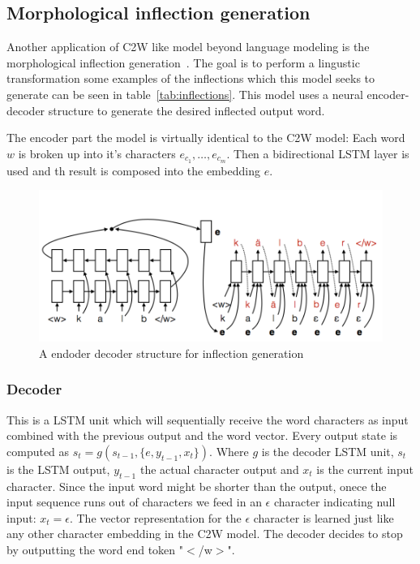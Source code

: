 \subsection{Morphological inflection generation} 

Another application of C2W like model beyond language modeling is the morphological inflection generation~\cite{DBLP:journals/corr/FaruquiTND15}.
The goal is to perform a lingustic transformation some examples of the inflections which this model seeks to 
generate can be seen in table~\ref{tab:inflections}.
This model uses a neural encoder-decoder structure to generate the desired inflected output word.

The encoder part the model is virtually identical to the C2W model: 
Each word $w$ is broken up into it's characters $e_{c_1}, \dots, e_{c_m}$.
Then a bidirectional LSTM layer is used and th result is composed into the embedding $e$.

\begin{figure}[H]
\begin{center}
  \includegraphics[width=\textwidth]{./img/inflection-generation}
  \caption{A endoder decoder structure for inflection generation}
  \label{fig:inflection-generatior}
\end{center}
\end{figure}

\subsubsection{Decoder}
This is a LSTM unit which will sequentially receive the word characters as input combined with the previous output and the word vector.
Every output state is computed as $s_t = g(s_{t-1}, \{e, y_{t-1}, x_t\})$. Where $g$ is the decoder LSTM unit,
$s_t$ is the LSTM output, $y_{t-1}$ the actual character output and $x_t$ is the current input character.
Since the input word might be shorter than the output, onece the input sequence runs out of characters we feed in an $\epsilon$ character
indicating null input: $x_t = \epsilon$. The vector representation for the $\epsilon$ character is learned just like any 
other character embedding in the C2W model.
The decoder decides to stop by outputting the word end token "$<$/w$>$".

